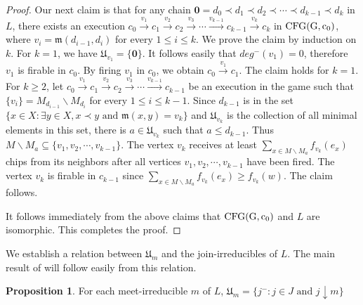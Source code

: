 \documentclass{article}
\theoremstyle{definition}
\newtheorem{prop}{Proposition}
\newcommand\down[1]{e_{#1}}
\newcommand\set[1]{\{ #1 \}}
\begin{document}
\begin{proof}
Our next claim is that for any chain $\textbf{0}=d_0\prec d_1\prec d_2 \prec \cdots \prec d_{k-1}\prec d_k$ in $L$, there exists an execution $c_0 \overset{v_1}{\to}c_1\overset{v_2}{\to}c_2\overset{v_3}{\to}\cdots \overset{v_{k-1}}{\to}c_{k-1}\overset{v_k}{\to}c_k$ in ${\rm CFG(G,c_0)}$, where $v_i=\mathfrak{m}(d_{i-1},d_i)$ for every $1 \leq i \leq k$. We prove the claim by induction on $k$. For $k=1$, we have $\mathfrak{U}_{v_1}=\set{\textbf{0}}$. It follows easily that $deg^{-}(v_1)=0$, therefore $v_1$ is firable in $c_0$. By firing $v_1$ in $c_0$, we obtain $c_0 \overset{v_1}{\to}c_1$. The claim holds for $k=1$. For $k\geq 2$, let $c_0\overset{v_1}{\to}c_1\overset{v_2}{\to}c_2\overset{v_3}{\to}\cdots \overset{v_{k-1}}{\to}c_{k-1}$ be an execution in the game such that $\set{v_i}=M_{d_{i-1}}\backslash M_{d_i}$ for every $1 \leq i\leq k-1$.
Since $d_{k-1}$ is in the set $\set{x \in X: \exists y\in X,x\prec y \text{ and } \mathfrak{m}(x,y)=v_k}$ and $\mathfrak{U}_{v_k}$ is the collection of all minimal elements in this set,  there is $a\in \mathfrak{U}_{v_k}$ such that $a \leq d_{k-1}$. Thus $M\backslash M_a\subseteq \set{v_1,v_2,\cdots,v_{k-1}}$. The vertex $v_k$ receives at least $\underset{x\in M\backslash M_a}{\sum}f_{v_k}(\down{x})$ chips from its neighbors after all vertices $v_1,v_2,\cdots,v_{k-1}$ have been fired. The vertex $v_k$ is firable in $c_{k-1}$ since $\underset{x \in M\backslash M_a}{\sum}f_{v_k}(\down{x})\geq f_{v_k}(w)$. The claim follows.

It follows immediately from the above claims that ${\rm CFG(G,c_0)}$ and $L$ are isomorphic. This completes the proof.
\end{proof}
We establish a relation between $\mathfrak{U}_m$ and the join-irreducibles of $L$. The main result of \cite{MVP01} will follow easily from this relation.
\begin{prop}
\label{relation with join-irreducibles}
For each meet-irreducible $m$ of $L$, $\mathfrak{U}_m=\set{j^{-}: j \in J \text{ and } j \downarrow m}$
\end{prop}
\end{document}
